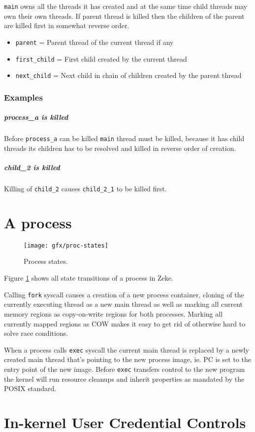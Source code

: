 \verb+main+ owns all the threads it has created and at the same time child
threads may own their own threads. If parent thread is killed then the
children of the parent are killed first in somewhat reverse order.

\begin{itemize}
  \item \verb+parent+ = Parent thread of the current thread if any
  \item \verb+first_child+ = First child created by the current thread
  \item \verb+next_child+ = Next child in chain of children created by the
        parent thread
\end{itemize}

\subsubsection{Examples}

\subparagraph*{process\_a is killed}

Before \verb+process_a+ can be killed \verb+main+ thread must be killed,
because it has child threads its children has to be resolved and killed in
reverse order of creation.

\subparagraph*{child\_2 is killed}

Killing of \verb+child_2+ causes \verb+child_2_1+ to be killed first.

\section{A process}

\begin{figure}
  \center
  \texttt{[image: gfx/proc-states]}
  \caption{Process states.}
  \label{figure:procstates}
\end{figure}

Figure \ref{figure:procstates} shows all state transitions
of a process in Zeke.

Calling \verb+fork+ syscall causes a creation of a new process container,
cloning of the currently executing thread as a new main thread as well as
marking all current memory regions as copy-on-write regions for both processes.
Marking all currently mapped regions as COW makes it easy to get rid of
otherwise hard to solve race conditions.

When a process calls \verb+exec+ syscall the current main thread is replaced by
a newly created main thread that's pointing to the new process image, ie.
\acs{PC} is set to the entry point of the new image. Before \verb+exec+
transfers control to the new program the kernel will run resource cleanups and
inherit properties as mandated by the \acs{POSIX} standard.

\section{In-kernel User Credential Controls}
